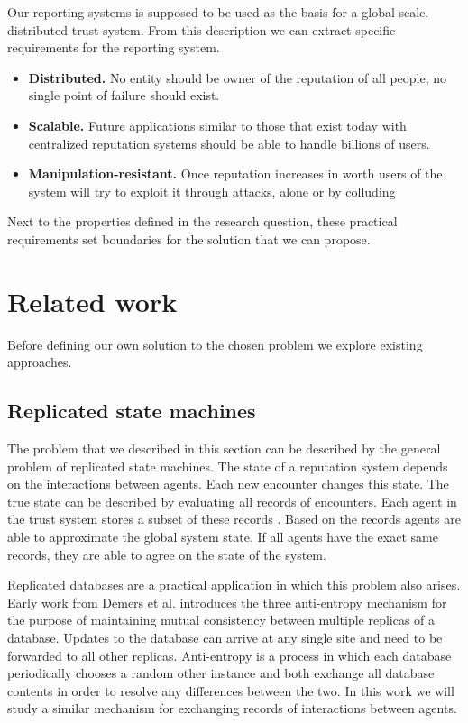 Our reporting systems is supposed to be used as the basis for a global scale, distributed trust system. 
From this description we can extract specific requirements for the reporting system.


\begin{itemize}
    \item \textbf{Distributed.} No entity should be owner of the reputation of all people, no single point of
    failure should exist.
    \item \textbf{Scalable.} Future applications similar to those that exist today with centralized reputation
    systems should be able to handle billions of users.
    \item \textbf{Manipulation-resistant.} Once reputation increases in worth users of the 
    system will try to exploit it through attacks, alone or by colluding
\end{itemize}

Next to the properties defined in the research question, these practical requirements set boundaries
for the solution that we can propose.

\section{Related work}
Before defining our own solution to the chosen problem we explore existing approaches.

\subsection{Replicated state machines}
The problem that we described in this section can be described by the general problem of replicated 
state machines. The state of a reputation system depends on the interactions between agents. Each 
new encounter changes this state. The true state can be described by evaluating all records of 
encounters. Each agent in the trust system stores a subset of these records . Based on the records
agents are able to approximate the global system state. If all agents have the exact same records, 
they are able to agree on the state of the system. 

Replicated databases are a practical application in which this problem also arises. Early work from
Demers et al.\cite{demers1987epidemic} introduces the three anti-entropy mechanism
for the purpose of maintaining mutual consistency between multiple replicas of a database. Updates
to the database can arrive at any single site and need to be forwarded to all other replicas. 
Anti-entropy is a process in which each database periodically 
chooses a random other instance and both exchange all database contents in order to resolve any 
differences between the two. In this work we will study a similar mechanism for exchanging records
of interactions between agents. 

